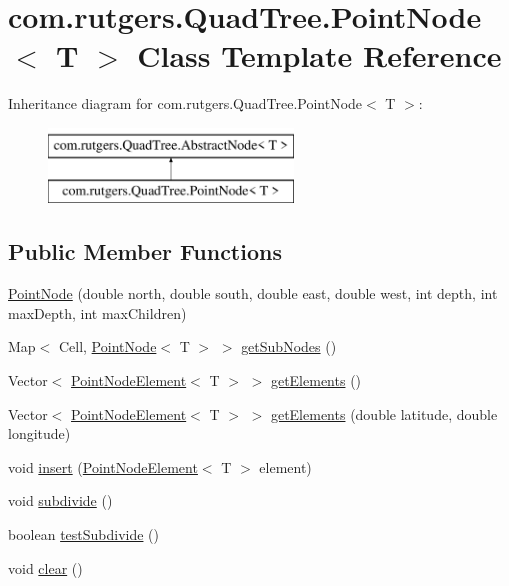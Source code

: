 \hypertarget{classcom_1_1rutgers_1_1QuadTree_1_1PointNode}{}\section{com.\+rutgers.\+Quad\+Tree.\+Point\+Node$<$ T $>$ Class Template Reference}
\label{classcom_1_1rutgers_1_1QuadTree_1_1PointNode}
Inheritance diagram for com.\+rutgers.\+Quad\+Tree.\+Point\+Node$<$ T $>$\+:\begin{figure}[H]
\begin{center}
\leavevmode
\includegraphics[height=2.000000cm]{classcom_1_1rutgers_1_1QuadTree_1_1PointNode}
\end{center}
\end{figure}
\subsection*{Public Member Functions}
\begin{DoxyCompactItemize}
\item 
\hyperlink{classcom_1_1rutgers_1_1QuadTree_1_1PointNode_a3c57944cb98cfd710608b57fefcd64c2}{Point\+Node} (double north, double south, double east, double west, int depth, int max\+Depth, int max\+Children)
\item 
Map$<$ Cell, \hyperlink{classcom_1_1rutgers_1_1QuadTree_1_1PointNode}{Point\+Node}$<$ T $>$ $>$ \hyperlink{classcom_1_1rutgers_1_1QuadTree_1_1PointNode_a0e45f85c9b62f83648033a73c4d8247a}{get\+Sub\+Nodes} ()
\item 
Vector$<$ \hyperlink{classcom_1_1rutgers_1_1QuadTree_1_1PointNodeElement}{Point\+Node\+Element}$<$ T $>$ $>$ \hyperlink{classcom_1_1rutgers_1_1QuadTree_1_1PointNode_a59932b71d5045e3192a093ed57361140}{get\+Elements} ()
\item 
Vector$<$ \hyperlink{classcom_1_1rutgers_1_1QuadTree_1_1PointNodeElement}{Point\+Node\+Element}$<$ T $>$ $>$ \hyperlink{classcom_1_1rutgers_1_1QuadTree_1_1PointNode_abf17594daa50fa4958b91a2991fcb1a1}{get\+Elements} (double latitude, double longitude)
\item 
void \hyperlink{classcom_1_1rutgers_1_1QuadTree_1_1PointNode_a8b9eceb7216cbb98a251c6fbc3d42d4b}{insert} (\hyperlink{classcom_1_1rutgers_1_1QuadTree_1_1PointNodeElement}{Point\+Node\+Element}$<$ T $>$ element)
\item 
void \hyperlink{classcom_1_1rutgers_1_1QuadTree_1_1PointNode_a0177d4d297bf8a6fdeac5b014f1205df}{subdivide} ()
\item 
boolean \hyperlink{classcom_1_1rutgers_1_1QuadTree_1_1PointNode_ad9eb9b306f9604a2c688a6c906cb6e83}{test\+Subdivide} ()
\item 
void \hyperlink{classcom_1_1rutgers_1_1QuadTree_1_1PointNode_a806f2958ac623cadc0687adc2b7df724}{clear} ()
\end{DoxyCompactItemize}
